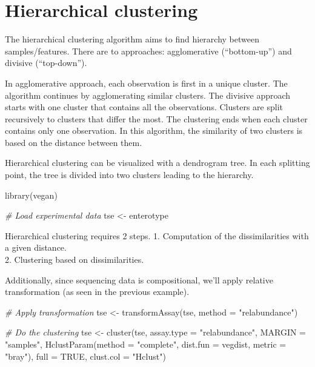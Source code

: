 \documentclass[
]{book}
\newenvironment{Shaded}{\begin{snugshade}}{\end{snugshade}}
\newcommand{\AttributeTok}[1]{\textcolor[rgb]{0.77,0.63,0.00}{#1}}
\newcommand{\CommentTok}[1]{\textcolor[rgb]{0.56,0.35,0.01}{\textit{#1}}}
\newcommand{\ConstantTok}[1]{\textcolor[rgb]{0.00,0.00,0.00}{#1}}
\newcommand{\FunctionTok}[1]{\textcolor[rgb]{0.00,0.00,0.00}{#1}}
\newcommand{\NormalTok}[1]{#1}
\newcommand{\OtherTok}[1]{\textcolor[rgb]{0.56,0.35,0.01}{#1}}
\newcommand{\StringTok}[1]{\textcolor[rgb]{0.31,0.60,0.02}{#1}}
\begin{document}
\hypertarget{hierarchical-clustering}{%
\section{Hierarchical clustering}\label{hierarchical-clustering}}

The hierarchical clustering algorithm aims to find hierarchy between
samples/features. There are to approaches: agglomerative (``bottom-up'')
and divisive (``top-down'').

In agglomerative approach, each observation is first in a unique cluster.
The algorithm continues by agglomerating similar clusters. The divisive
approach starts with one cluster that contains all the observations.
Clusters are split recursively to clusters that differ the most.
The clustering ends when each cluster contains only one observation.
In this algorithm, the similarity of two clusters is based on the distance
between them.

Hierarchical clustering can be visualized with a dendrogram tree. In each
splitting point, the tree is divided into two clusters leading to the
hierarchy.

\begin{Shaded}
\begin{Highlighting}[]
\FunctionTok{library}\NormalTok{(vegan)}

\CommentTok{\# Load experimental data}
\NormalTok{tse }\OtherTok{\textless{}{-}}\NormalTok{ enterotype}
\end{Highlighting}
\end{Shaded}

Hierarchical clustering requires 2 steps.
1. Computation of the dissimilarities with a given distance.\\
2. Clustering based on dissimilarities.

Additionally, since sequencing data is compositional, we'll apply relative
transformation (as seen in the previous example).

\begin{Shaded}
\begin{Highlighting}[]
\CommentTok{\# Apply transformation}
\NormalTok{tse }\OtherTok{\textless{}{-}} \FunctionTok{transformAssay}\NormalTok{(tse, }\AttributeTok{method =} \StringTok{"relabundance"}\NormalTok{)}

\CommentTok{\# Do the clustering}
\NormalTok{tse }\OtherTok{\textless{}{-}} \FunctionTok{cluster}\NormalTok{(tse,}
               \AttributeTok{assay.type =} \StringTok{"relabundance"}\NormalTok{,}
               \AttributeTok{MARGIN =} \StringTok{"samples"}\NormalTok{,}
               \FunctionTok{HclustParam}\NormalTok{(}\AttributeTok{method =} \StringTok{"complete"}\NormalTok{,}
                           \AttributeTok{dist.fun =}\NormalTok{ vegdist,}
                           \AttributeTok{metric =} \StringTok{"bray"}\NormalTok{),}
               \AttributeTok{full =} \ConstantTok{TRUE}\NormalTok{,}
               \AttributeTok{clust.col =} \StringTok{"Hclust"}\NormalTok{)}
\end{Highlighting}
\end{Shaded}
\end{document}
